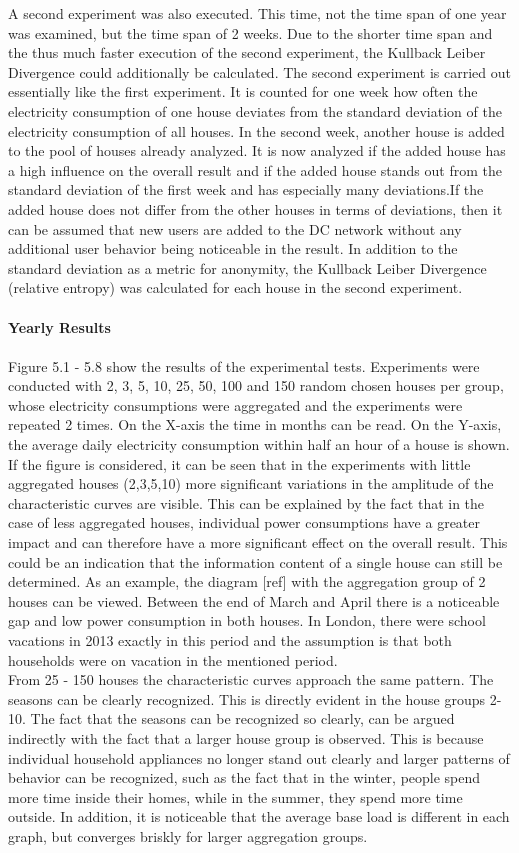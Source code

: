 A second experiment was also executed. This time, not the time span of one year was examined, but the time span of 2 weeks. Due to the shorter time span and the thus much faster execution of the second experiment, the Kullback Leiber Divergence could additionally be calculated. 
The second experiment is carried out essentially like the first experiment. It is counted for one week how often the electricity consumption of one house deviates from the standard deviation of the electricity consumption of all houses. In the second week, another house is added to the pool of houses already analyzed. It is now analyzed if the added house has a high influence on the overall result and if the added house stands out from the standard deviation of the first week and has especially many deviations.If the added house does not differ from the other houses in terms of deviations, then it can be assumed that new users are added to the DC network without any additional user behavior being noticeable in the result. In addition to the standard deviation as a metric for anonymity, the Kullback Leiber Divergence (relative entropy) was calculated for each house in the second experiment.
\\
\\
\textbf{Yearly Results}
\\
\\
Figure 5.1 - 5.8 show the results of the experimental tests. Experiments were conducted with 2, 3, 5, 10, 25, 50, 100 and 150 random chosen houses per group, whose electricity consumptions were aggregated and the experiments were repeated 2 times. On the X-axis the time in months can be read. On the Y-axis, the average daily electricity consumption within half an hour of a house is shown. If the figure is considered, it can be seen that in the experiments with little aggregated houses (2,3,5,10) more significant variations in the amplitude of the characteristic curves are visible. This can be explained by the fact that in the case of less aggregated houses, individual power consumptions have a greater impact and can therefore have a more significant effect on the overall result. This could be an indication that the information content of a single house can still be determined. As an example, the diagram [ref] with the aggregation group of 2 houses can be viewed. Between the end of March and April there is a noticeable gap and low power consumption in both houses. In London, there were school vacations in 2013 exactly in this period and the assumption is that both households were on vacation in the mentioned period.\\
From 25 - 150 houses the characteristic curves approach the same pattern. The seasons can be clearly recognized. This is directly evident in the house groups 2-10. The fact that the seasons can be recognized so clearly, can be argued indirectly with the fact that a larger house group is observed. This is because individual household appliances no longer stand out clearly and larger patterns of behavior can be recognized, such as the fact that in the winter, people spend more time inside their homes, while in the summer, they spend more time outside. In addition, it is noticeable that the average base load is different in each graph, but converges briskly for larger aggregation groups. 

